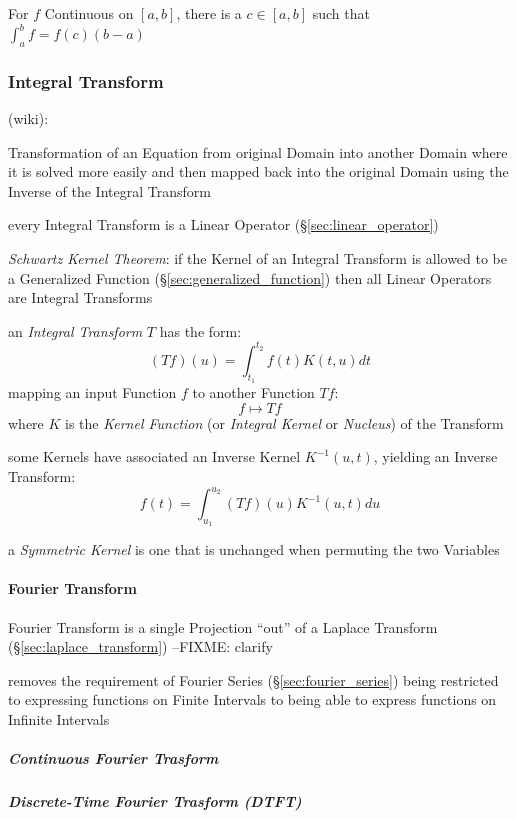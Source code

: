 For $f$ Continuous on $[a,b]$, there is a $c \in [a,b]$ such that
$\int_a^b f = f(c)(b - a)$



\subsubsection{Integral Transform}\label{sec:integral_transform}

(wiki):

Transformation of an Equation from original Domain into another Domain where it
is solved more easily and then mapped back into the original Domain using the
Inverse of the Integral Transform

every Integral Transform is a Linear Operator (\S\ref{sec:linear_operator})

\emph{Schwartz Kernel Theorem}: if the Kernel of an Integral Transform is
allowed to be a Generalized Function (\S\ref{sec:generalized_function}) then
all Linear Operators are Integral Transforms

an \emph{Integral Transform} $T$ has the form:
\[
  (T f)(u) = \int_{t_1}^{t_2} f(t) K(t,u) dt
\]
mapping an input Function $f$ to another Function $T f$:
\[
  f \mapsto T f
\]
where $K$ is the \emph{Kernel Function} (or \emph{Integral Kernel} or
\emph{Nucleus}) of the Transform

some Kernels have associated an Inverse Kernel $K^{-1}(u,t)$, yielding an
Inverse Transform:
\[
  f(t) = \int_{u_1}^{u_2} (T f)(u) K^{-1}(u,t) du
\]

a \emph{Symmetric Kernel} is one that is unchanged when permuting the two
Variables



\paragraph{Fourier Transform}\label{sec:fourier_transform}\hfill

Fourier Transform is a single Projection ``out'' of a Laplace Transform
(\S\ref{sec:laplace_transform}) --FIXME: clarify

removes the requirement of Fourier Series (\S\ref{sec:fourier_series}) being
restricted to expressing functions on Finite Intervals to being able to express
functions on Infinite Intervals



\subparagraph{Continuous Fourier Trasform}
\label{sec:continuous_fourier_transform}\hfill

\subparagraph{Discrete-Time Fourier Trasform (DTFT)}\label{sec:dtft}\hfill



